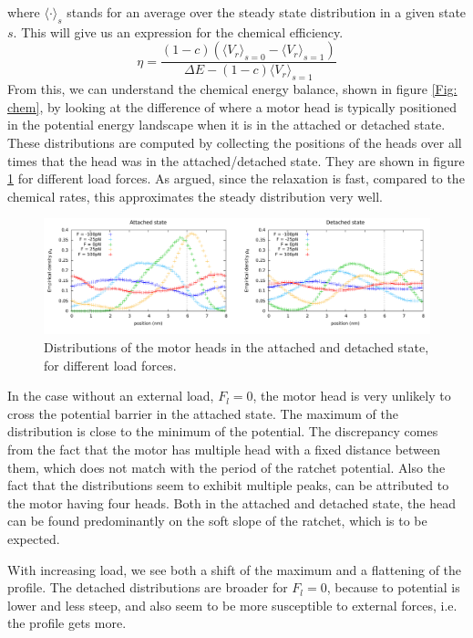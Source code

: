 \documentclass[aps,pre,onecolumn,showpacs,showkeys,a4paper]{revtex4}
\begin{document}
where $\langle \cdot \rangle_{s}$ stands for an average over the steady state distribution in a given state $s$. 
This will give us an expression for the chemical efficiency.
\begin{equation}
\eta = \frac{(1-c)\left(\langle V_r\rangle_{s=0}-\langle V_r\rangle_{s=1}\right)}{\Delta E - (1-c)\langle V_r\rangle_{s=1}}\label{eta}
\end{equation}
From this, we can understand the chemical energy balance, shown in figure \ref{Fig: chem}, by looking at the difference of where a motor head is typically positioned in the potential energy landscape when it is in the attached or detached state. 
These distributions are computed by collecting the positions of the heads over all times that the head was in the attached/detached state. 
They are shown in figure \ref{Fig: pos_distr} for different load forces. 
As argued, since the relaxation is fast, compared to the chemical rates, this approximates the steady distribution very well.
\begin{figure}[h]
\centering
\includegraphics[width=1\textwidth,height=!]{pos_distr_all_F}
\caption{Distributions of the motor heads in the attached and detached state, for different load forces.}
\label{Fig: pos_distr}
\end{figure}
In the case without an external load, $F_l=0$, the motor head is very unlikely to cross the potential barrier in the attached state. 
The maximum of the distribution is close to the minimum of the potential. 
The discrepancy comes from the fact that the motor has multiple head with a fixed distance between them, which does not match with the period of the ratchet potential. 
Also the fact that the distributions seem to exhibit multiple peaks, can be attributed to the motor having four heads. 
Both in the attached and detached state, the head can be found predominantly on the soft slope of the ratchet, which is to be expected.\par
With increasing load, we see both a shift of the maximum and a flattening of the profile. 
The detached distributions are broader for $F_l=0$, because to potential is lower and less steep, and also seem to be more susceptible to external forces, i.e. the profile gets more. \par
\end{document}
